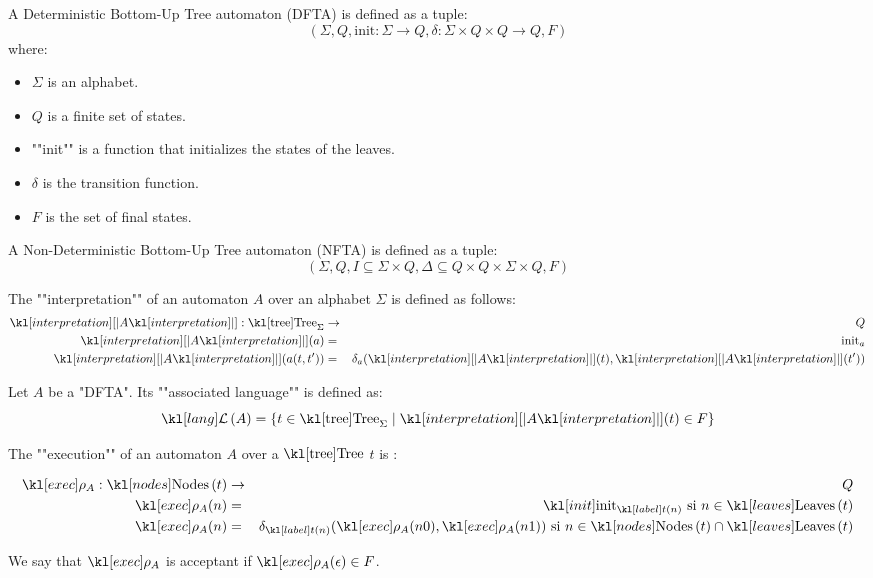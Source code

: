 \documentclass{article}
\begin{document}
\begin{definition}
	A Deterministic Bottom-Up Tree automaton (DFTA) is defined as a tuple:
	$$ (\Sigma, Q, \text{init} : \Sigma \to Q, \delta : \Sigma \times Q \times Q \to Q, F) $$
	where:
	\begin{itemize}
		\item $\Sigma$ is an alphabet.
		\item $Q$ is a finite set of states.
		\item ""init"" is a function that initializes the states of the leaves.
		\item $\delta$ is the transition function.
		\item $F$ is the set of final states.
	\end{itemize}
\end{definition}

\begin{definition}
	A Non-Deterministic Bottom-Up Tree automaton (NFTA) is defined as a tuple:
	$$ (\Sigma, Q, I \subseteq \Sigma \times Q, \Delta \subseteq Q \times Q \times \Sigma \times Q, F) $$
\end{definition}

\begin{definition}
	The ""interpretation"" of an automaton $A$ over an alphabet $\Sigma$ is defined as follows:
	\begin{eqnarray*}
		\interpret A : \tree_{\Sigma} &\to& Q \\
		\interpret A (a) &=& \text{init}_a \\
		\interpret A (a(t,t')) &=& \delta_a (\interpret A (t), \interpret A (t'))
	\end{eqnarray*}
\end{definition}

\begin{definition}
	Let $A$ be a "DFTA". Its ""associated language"" is defined as:
	$$\lang A = \setdef {t \in \tree_{\Sigma}} {\interpret A (t) \in F}$$
\end{definition}


\begin{definition}
	The ""execution"" of an automaton $A$ over a $\tree$ $t$ is :

	\begin{eqnarray*}
		\exec A : \nodes t &\to & Q \\
		\exec A (n)  &=& \init_{\tlabel t n} \text{ si } n \in \leaves t \\
		\exec A (n)  &=& \delta_{\tlabel t n}(\exec A (n0), \exec A (n1)) \text{ si } n \in \nodes t \cap \leaves t
	\end{eqnarray*}

	We say that $\exec A$ is acceptant if $\exec A (\epsilon) \in F$.
\end{definition}
\end{document}
